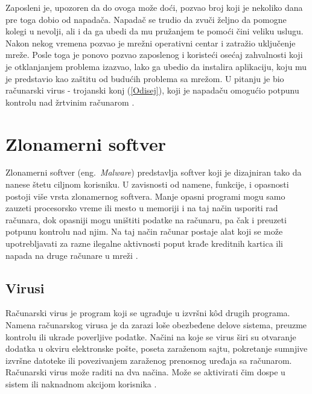 \documentclass[a4paper]{article}
\begin{document}
Zaposleni je, upozoren da do ovoga može doći, pozvao broj koji je nekoliko dana pre toga dobio od napadača. Napadač se trudio da zvuči željno da pomogne kolegi u nevolji, ali i da ga ubedi da mu pružanjem te pomoći čini veliku uslugu. Nakon nekog vremena pozvao je mrežni operativni centar i zatražio uključenje mreže. Posle toga je ponovo pozvao zaposlenog i koristeći osećaj zahvalnosti koji je otklanjanjem problema izazvao, lako ga ubedio da instalira aplikaciju, koju mu je predstavio kao zaštitu od budućih problema sa mrežom. U pitanju je bio računarski virus - trojanski konj (\ref{Odisej}), koji je napadaču omogućio potpunu kontrolu nad žrtvinim računarom \cite{deception}.

\section{Zlonamerni softver}

Zlonamerni softver (eng.~{\em Malware}) predstavlja softver koji je dizajniran tako da nanese štetu ciljnom korisniku. U zavisnosti od namene, funkcije, i opasnosti postoji više vrsta zlonamernog softvera. Manje opasni programi mogu samo zauzeti procesorsko vreme ili mesto u memoriji i na taj način usporiti rad računara, dok opasniji mogu uništiti podatke na računaru, pa čak i preuzeti potpunu kontrolu nad njim. Na taj način računar postaje alat koji se može upotrebljavati za razne ilegalne aktivnosti poput krađe kreditnih kartica ili napada na druge računare u mreži \cite{ethics}.


\subsection{Virusi}
\label{sec:malware}

Računarski virus je program koji se ugrađuje u izvršni kôd drugih programa. Namena računarskog virusa je da zarazi loše obezbeđene delove sistema, preuzme kontrolu ili ukrade poverljive podatke. Načini na koje se virus širi su otvaranje dodatka u okviru elektronske pošte, poseta zaraženom sajtu, pokretanje sumnjive izvršne datoteke ili povezivanjem zaraženog prenosnog uređaja sa računarom. Računarski virus može raditi na dva načina. Može se aktivirati čim dospe u sistem ili naknadnom akcijom korisnika \cite{viruses_and_worms,computer_virus}.
\end{document}
